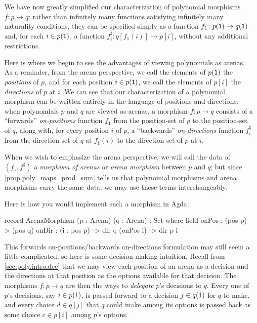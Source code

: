 \documentclass[Book-Poly]{subfiles}
\begin{document}
We have now greatly simplified our characterization of polynomial morphisms $f \colon p \to q$: rather than infinitely many functions satisfying infinitely many naturality conditions, they can be specified simply as a function $f_1 \colon p(\textsf{1}) \to q(\textsf{1})$ and, for each $i \in p(\textsf{1})$, a function $f^\sharp_i \colon q[f_1(i)] \to p[i]$, without any additional restrictions.

Here is where we begin to see the advantages of viewing polynomials as arenas.
As a reminder, from the arena perspective, we call the elements of $p(\textsf{1})$ the \emph{positions} of $p$, and for each position $i \in p(\textsf{1})$, we call the elements of $p[i]$ the \emph{directions} of $p$ at $i$.
We can see that our characterization of a polynomial morphism can be written entirely in the language of positions and directions: when polynomials $p$ and $q$ are viewed as arenas, a morphism $f \colon p \to q$ consists of a ``forwards'' \emph{on-positions} function $f_1$ from the position-set of $p$ to the position-set of $q$, along with, for every position $i$ of $p$, a ``backwards'' \emph{on-directions} function $f^\sharp_i$ from the direction-set of $q$ at $f_1(i)$ to the direction-set of $p$ at $i$.

When we wish to emphasize the arena perspective, we will call the data of $(f_1, f^\sharp)$ a \emph{morphism of arenas} or \emph{arena morphism} between $p$ and $q$; but since \cref{prop.poly_maps_prod_sum} tells us that polynomial morphisms and arena morphisms carry the same data, we may use these terms interchangeably.

Here is how you would implement such a morphism in Agda:
\begin{agda}
record ArenaMorphism (p : Arena) (q : Arena) : Set where
   field
     onPos : (pos p) -> (pos q)
     onDir : (i : pos p) -> dir q (onPos i) -> dir p i
\end{agda}

This forwards on-positions/backwards on-directions formulation may still seem a little complicated, so here is some decision-making intuition.
Recall from \cref{sec.poly.intro.dec} that we may view each position of an arena as a decision and the directions at that position as the options available for that decision.
The morphisms $f\colon p\to q$ are then the ways to \emph{delegate} $p$'s decisions to $q$. Every one of $p$'s decisions, say $i\in p(\textsf{1})$, is passed forward to a decision $j\in q(\textsf{1})$ for $q$ to make, and every choice $d\in q[j]$ that $q$ could make among its options is passed back as some choice $c\in p[i]$ among $p$'s options.
\end{document}
